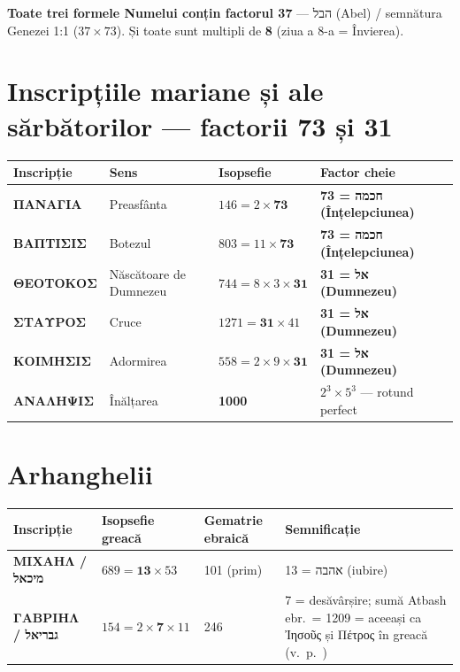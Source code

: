 \documentclass[12pt,a4paper,twoside,openany]{book}
\begin{document}
\textbf{\textcolor{primary}{Toate trei formele Numelui conțin factorul 37}} --- הבל (Abel) / semnătura Genezei 1:1 ($37 \times 73$). Și toate sunt multipli de \textbf{8} (ziua a 8-a = Învierea).

\section*{Inscripțiile mariane și ale sărbătorilor --- factorii 73 și 31}
\begin{center}
\small
\begin{tabular}{L{3cm}L{3.5cm}C{2cm}L{3.5cm}}
\toprule
{}
\textbf{Inscripție} & \textbf{Sens} & \textbf{Isopsefie} & \textbf{Factor cheie} \\
\midrule
\textbf{ΠΑΝΑΓΙΑ} & Preasfânta & $146 = 2 \times \mathbf{73}$ & \textbf{73 = חכמה (Înțelepciunea)} \\
\textbf{ΒΑΠΤΙΣΙΣ} & Botezul & $803 = 11 \times \mathbf{73}$ & \textbf{73 = חכמה (Înțelepciunea)} \\
\textbf{ΘΕΟΤΟΚΟΣ} & Născătoare de Dumnezeu & $744 = 8 \times 3 \times \mathbf{31}$ & \textbf{31 = אל (Dumnezeu)} \\
\textbf{ΣΤΑΥΡΟΣ} & Cruce & $1271 = \mathbf{31} \times 41$ & \textbf{31 = אל (Dumnezeu)} \\
\textbf{ΚΟΙΜΗΣΙΣ} & Adormirea & $558 = 2 \times 9 \times \mathbf{31}$ & \textbf{31 = אל (Dumnezeu)} \\
\textbf{ΑΝΑΛΗΨΙΣ} & Înălțarea & \textbf{1000} & $2^3 \times 5^3$ --- rotund perfect \\
\bottomrule
\end{tabular}
\end{center}

\section*{Arhanghelii}
\begin{center}
\small
\begin{tabular}{L{3cm}C{2.5cm}C{2.5cm}L{4cm}}
\toprule
{}
\textbf{Inscripție} & \textbf{Isopsefie greacă} & \textbf{Gematrie ebraică} & \textbf{Semnificație} \\
\midrule
\textbf{ΜΙΧΑΗΛ / מיכאל} & $689 = \mathbf{13} \times 53$ & 101 (prim) & 13 = אהבה (iubire) \\
\textbf{ΓΑΒΡΙΗΛ / גבריאל} & $154 = 2 \times \mathbf{7} \times 11$ & 246 & 7 = desăvârșire; sumă Atbash ebr.\ = 1209 = aceeași ca Ἰησοῦς și Πέτρος în greacă (v.~p.~\pageref{pestele}) \\
\bottomrule
\end{tabular}
\end{center}
\end{document}
